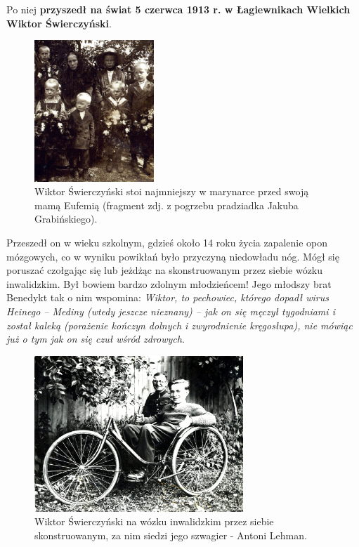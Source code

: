Po niej \textbf{przyszedł na świat 5 czerwca 1913 r. w Łagiewnikach Wielkich Wiktor Świerczyński}.

\begin{figure}[!h]
\begin{center}
\includegraphics[width=0.4\textwidth]{photo/wiktor_swierczynski_1.jpg}
\caption[Wiktor Świerczyński z mamą Eufemią]{Wiktor Świerczyński stoi najmniejszy w marynarce przed swoją mamą Eufemią (fragment zdj. z pogrzebu pradziadka Jakuba Grabińskiego).}
\label{rys:wiktor_swierczynski_1}
\end{center}
\end{figure}

Przeszedł on w wieku szkolnym, gdzieś około 14 roku życia zapalenie opon mózgowych, co w wyniku powikłań było przyczyną niedowładu nóg. Mógł się poruszać czołgając się lub jeżdżąc na skonstruowanym przez siebie wózku inwalidzkim. Był bowiem bardzo zdolnym młodzieńcem! Jego młodszy brat Benedykt tak o nim wspomina: \textit{Wiktor, to pechowiec, którego dopadł wirus Heinego – Mediny (wtedy jeszcze nieznany) – jak on się męczył tygodniami i został kaleką (porażenie kończyn dolnych i zwyrodnienie kręgosłupa), nie mówiąc już o tym jak on się czuł wśród zdrowych}.

\begin{figure}[!h]
\begin{center}
\includegraphics[width=0.7\textwidth]{photo/wiktor_swierczynski_2.jpg}
\caption[Wiktor Świerczyński i Antoni Lehman]{Wiktor Świerczyński na wózku inwalidzkim przez siebie skonstruowanym, za nim siedzi jego szwagier - Antoni Lehman.}
\label{rys:wiktor_swierczynski_2}
\end{center}
\end{figure}


